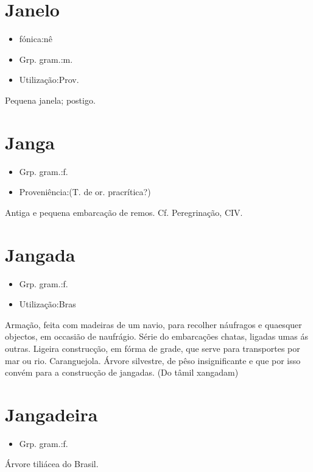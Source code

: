 \documentclass{article}
\begin{document}
\section{Janelo}
\begin{itemize}
\item {fónica:nê}
\end{itemize}
\begin{itemize}
\item {Grp. gram.:m.}
\end{itemize}
\begin{itemize}
\item {Utilização:Prov.}
\end{itemize}
Pequena janela; postigo.
\section{Janga}
\begin{itemize}
\item {Grp. gram.:f.}
\end{itemize}
\begin{itemize}
\item {Proveniência:(T. de or. pracrítica?)}
\end{itemize}
Antiga e pequena embarcação de remos. Cf. \textunderscore Peregrinação\textunderscore , CIV.
\section{Jangada}
\begin{itemize}
\item {Grp. gram.:f.}
\end{itemize}
\begin{itemize}
\item {Utilização:Bras}
\end{itemize}
Armação, feita com madeiras de um navio, para recolher náufragos e quaesquer objectos, em occasião de naufrágio.
Série do embarcações chatas, ligadas umas ás outras.
Ligeira construcção, em fórma de grade, que serve para transportes por mar ou rio.
Caranguejola.
Árvore silvestre, de pêso insignificante e que por isso convém para a construcção de jangadas.
(Do tâmil \textunderscore xangadam\textunderscore )
\section{Jangadeira}
\begin{itemize}
\item {Grp. gram.:f.}
\end{itemize}
Árvore tiliácea do Brasil.
\end{document}
